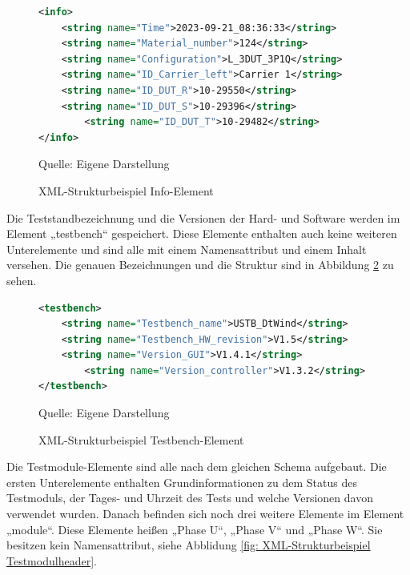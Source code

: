 \begin{figure}[H]
\centering
\begin{minipage}{0.95\textwidth}
\begin{lstlisting}[language=XML]
<info>
	<string name="Time">2023-09-21_08:36:33</string>
	<string name="Material_number">124</string>
	<string name="Configuration">L_3DUT_3P1Q</string>
	<string name="ID_Carrier_left">Carrier 1</string>
	<string name="ID_DUT_R">10-29550</string>
	<string name="ID_DUT_S">10-29396</string>
        <string name="ID_DUT_T">10-29482</string>
</info>
\end{lstlisting}
\end{minipage}
\caption{XML-Strukturbeispiel Info-Element}
\label{fig: XML-Strukturbeispiel Info-Element}
    {Quelle: Eigene Darstellung}
\end{figure}

Die Teststandbezeichnung und die Versionen der Hard- und Software werden im Element „testbench“ gespeichert.
Diese Elemente enthalten auch keine weiteren Unterelemente und sind alle mit einem Namensattribut und einem Inhalt versehen.
Die genauen Bezeichnungen und die Struktur sind in Abbildung \ref{fig: XML-Strukturbeispiel Testbench-Element} zu sehen.

\begin{figure}[H]
\centering
\begin{minipage}{0.95\textwidth}
\begin{lstlisting}[language=XML]
<testbench>
	<string name="Testbench_name">USTB_DtWind</string>
	<string name="Testbench_HW_revision">V1.5</string>
	<string name="Version_GUI">V1.4.1</string>
        <string name="Version_controller">V1.3.2</string>
</testbench>
\end{lstlisting}
\end{minipage}
\caption{XML-Strukturbeispiel Testbench-Element}
\label{fig: XML-Strukturbeispiel Testbench-Element}
    {Quelle: Eigene Darstellung}
\end{figure}


Die Testmodule-Elemente sind alle nach dem gleichen Schema aufgebaut. Die ersten Unterelemente enthalten Grundinformationen
zu dem Status des Testmoduls, der Tages- und Uhrzeit des Tests und welche Versionen davon verwendet wurden.
Danach befinden sich noch drei weitere Elemente im Element „module“.
Diese Elemente heißen „Phase U“, „Phase V“ und „Phase W“.
Sie besitzen kein Namensattribut, siehe Abblidung \ref{fig: XML-Strukturbeispiel Testmodulheader}.

